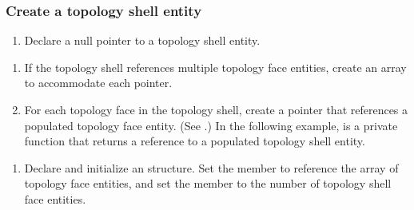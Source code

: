 \documentclass[letterpaper,12pt,english,openany,oneside]{sphinxmanual}
\begin{document}
\subsubsection{Create a topology shell entity}
\label{\detokenize{Plugins_A3D_API:create-a-topology-shell-entity}}\begin{enumerate}
%
\item {} 
Declare a null pointer to a topology shell entity.

\end{enumerate}

\begin{sphinxVerbatim}[commandchars=\\\{\}]
   
\end{sphinxVerbatim}
\begin{enumerate}
%
\setcounter{enumi}{1}
\item {} 
If the topology shell references multiple topology face entities, create an array to accommodate each pointer.

\item {} 
For each topology face in the topology shell, create a pointer that references a populated topology face entity. (See .) In the following example,  is a private function that returns a reference to a populated topology shell entity.

\end{enumerate}

\begin{sphinxVerbatim}[commandchars=\\\{\}]
   
\end{sphinxVerbatim}
\begin{enumerate}
%
\setcounter{enumi}{3}
\item {} 
Declare and initialize an  structure. Set the  member to reference the array of topology face entities, and set the  member to the number of topology shell face entities.

\end{enumerate}
\end{document}
